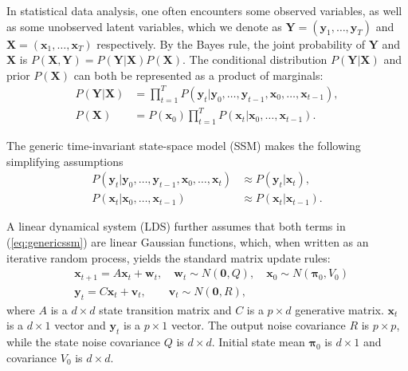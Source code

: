 \documentclass[fleqn,12pt]{article}
\let\oldref\ref
\renewcommand{\ref}[1]{(\oldref{#1})}
\providecommand{\mb}[1]{\boldsymbol{#1}}
\newcommand{\bx}{\mb{x}}
\newcommand{\by}{\mb{y}}
\newcommand{\bX}{\mb{X}}
\newcommand{\bY}{\mb{Y}}
\begin{document}
In statistical data analysis, one often encounters some observed variables, as well as some unobserved latent variables, which we denote as $\bY=(\by_1,\ldots,\by_T)$ and $\bX=(\bx_1,\ldots,\bx_T)$ respectively. By the Bayes rule, the joint probability of $\bY$ and $\bX$ is $P(\bX,\bY)=P(\bY|\bX) P(\bX)$. The conditional distribution $P(\mb{Y}|\mb{X})$ and prior $P(\mb{X})$ can both be represented as a product of marginals:
\begin{equation*}
\begin{aligned}
P(\mb{Y}|\mb{X}) &= \prod_{t=1}^T P(\by_t | \by_0,\ldots,\by_{t-1}, \bx_0,\ldots,\bx_{t-1}), \\
P(\bX) &= P(\bx_0) \prod_{t=1}^T P(\bx_t | \bx_0,\ldots,\bx_{t-1}).
\end{aligned}
\end{equation*}

The generic time-invariant state-space model (SSM) makes the following simplifying assumptions
\begin{equation}
\label{eq:genericssm}
\begin{aligned}
P(\by_t | \by_0,\ldots,\by_{t-1}, \bx_0,\ldots,\bx_t)  &\approx P(\by_t | \bx_t), \\
P(\bx_t | \bx_0,\ldots,\bx_{t-1}) &\approx P(\bx_t | \bx_{t-1}).
\end{aligned}
\end{equation}

A linear dynamical system (LDS) further assumes that both terms in \ref{eq:genericssm} are linear Gaussian functions, which, when written as an iterative random process, yields the standard matrix update rules:
\begin{equation*}
\begin{aligned}
&\bx_{t+1}=A\bx_t+\mathbf{w}_t, \quad \mathbf{w}_t\sim N(\mathbf{0},Q),\quad \bx_0 \sim N(\mathbf{\pi}_0,V_0)\\
&\by_t=C\bx_t+\mathbf{v}_t,\qquad \mathbf{v}_t\sim N(\mathbf{0},R),
\end{aligned}
\end{equation*}
where $A$ is a $d\times d$ state transition matrix and $C$ is a $p \times d$ generative matrix. $\bx_t$ is a $d\times 1$ vector and $\by_t$ is a $p\times 1$ vector.
The output noise covariance $R$ is $p\times p$, while the state noise covariance $Q$ is $d\times d$. Initial state mean $\mathbf{\pi}_0$ is $d\times 1$ and covariance $V_0$ is $d \times d$.
\end{document}
